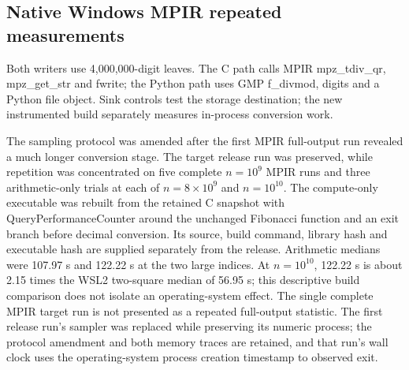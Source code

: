 \documentclass[11pt,a4paper]{article}
\begin{document}
\subsection{Native Windows MPIR repeated measurements}

Both writers use 4,000,000-digit leaves. The C path calls MPIR mpz\_\allowbreak{}tdiv\_\allowbreak{}qr, mpz\_\allowbreak{}get\_\allowbreak{}str and fwrite; the Python path uses GMP f\_\allowbreak{}divmod, digits and a Python file object. Sink controls test the storage destination; the new instrumented build separately measures in-process conversion work.

The sampling protocol was amended after the first MPIR full-output run revealed a much longer conversion stage. The target release run was preserved, while repetition was concentrated on five complete $n=10^{9}$ MPIR runs and three arithmetic-only trials at each of $n=8\times 10^{9}$ and $n=10^{10}$. The compute-only executable was rebuilt from the retained C snapshot with QueryPerformanceCounter around the unchanged Fibonacci function and an exit branch before decimal conversion. Its source, build command, library hash and executable hash are supplied separately from the release. Arithmetic medians were 107.97 s and 122.22 s at the two large indices. At $n=10^{10}$, 122.22 s is about 2.15 times the WSL2 two-square median of 56.95 s; this descriptive build comparison does not isolate an operating-system effect. The single complete MPIR target run is not presented as a repeated full-output statistic. The first release run's sampler was replaced while preserving its numeric process; the protocol amendment and both memory traces are retained, and that run's wall clock uses the operating-system process creation timestamp to observed exit.
\end{document}
